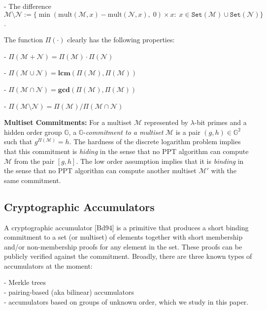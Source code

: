 \documentclass[11pt, lettersize, notitlepage, leqno, footskip=0.6cm]{article}
\newcommand{\ttt}{\texttt}
\newcommand{\bG}{\mathbb{G}}
\newcommand{\sett}{\ttt{Set}}
\newcommand{\mul}{\mr{mult}}
\newcommand{\mc}{\mathcal}
\newcommand{\mbf}{\mathbf}
\newcommand{\mr}{\mathrm}
\newcommand{\sm}{\setminus}
\newcommand{\lam}{\lambda}
\newcommand{\mcM}{\mc{M}}
\newcommand{\noin}{\noindent}
\newcommand{\LCM}{\mbf{lcm}}
\newcommand{\GCD}{\mbf{gcd}}
\numberwithin{equation}{section}
\begin{document}
\noin - The difference $\mc{M}\sm \mc{N} := \{\min(\mul(\mc{M},x)-\mul(\mc{N},x),\; 0)\times x:\;x\in \sett(\mc{M})\cup\sett(\mc{N})\}$.\vspace{0.1cm}

\noin The function $\Pi(\cdot)$ clearly has the following properties:

\noin- $\Pi(\mc{M}+\mc{N})= \Pi(\mc{M})\cdot\Pi(\mc{N})$

\noin - $\Pi(\mc{M}\cup \mc{N}) = \LCM(\Pi(\mc{M}), \Pi(\mc{M}))$

\noin - $\Pi(\mc{M}\cap \mc{N}) = \GCD(\Pi(\mc{M}), \Pi(\mc{M}))$

\noin - $\Pi(\mc{M}\sm \mc{N}) = {\Pi(\mc{M})}/{\Pi(\mc{M}\cap \mc{N})}$\vspace{0.2cm}

\noin \textbf{Multiset Commitments:} For a multiset $\mc{M}$ represented by $\lam$-bit primes and a hidden order group $\bG$, a $\bG$-\textit{commitment to a multiset} $\mc{M}$ is a pair $(g, h)\in\bG^2$ such that $g^{\Pi(\mc{M})} = h$. The hardness of the discrete logarithm problem implies that this commitment is \textit{hiding} in the sense that no PPT algorithm can compute $\mcM$ from the pair $[g,h]$. The low order assumption implies that it is \textit{binding} in the sense that no PPT algorithm can compute another multiset $\mcM'$ with the same commitment.

\subsection{\fontsize{11}{11}\selectfont Cryptographic Accumulators }

A cryptographic accumulator [Bd94] is a primitive that produces a short binding commitment to a set (or multiset) of elements together with short membership and/or non-membership proofs for any element in the set. These proofs can be publicly verified against the commitment. Broadly, there are three known types of accumulators at the moment: 

\noin - Merkle trees\\
- pairing-based (aka bilinear) accumulators \\  
- accumulators based on groups of unknown order, which we study in this paper. 
\end{document}
